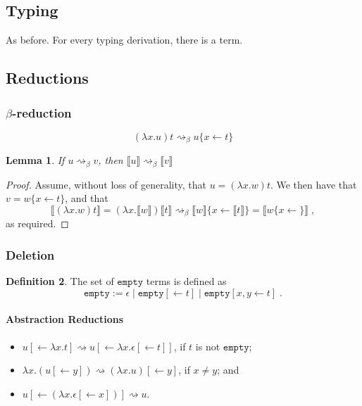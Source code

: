 \documentclass[11pt,a4paper]{article}
\theoremstyle{definition}
\newtheorem{definition}{Definition}
\theoremstyle{plain}
\newtheorem{lemma}[definition]{Lemma}
\theoremstyle{remark}
\begin{document}
\subsection{Typing}

As before. For every typing derivation, there is a term.

\subsection{Reductions}

\subsubsection{$\beta$-reduction}

\[
(\lambda x.u)t \rightsquigarrow_\beta u\{x\leftarrow t\}
\]


\begin{lemma}
	If $u\rightsquigarrow_\beta v$, then $\llbracket u\rrbracket \rightsquigarrow_\beta\llbracket v\rrbracket$
\end{lemma}

\begin{proof}
	Assume, without loss of generality, that $u=(\lambda x.w)t$. We then have that $v=w\{x\leftarrow t\}$, and that
	\[
	\llbracket(\lambda x.w)t\rrbracket = (\lambda x.\llbracket w\rrbracket)\llbracket t\rrbracket\rightsquigarrow_\beta\llbracket w\rrbracket\{x\leftarrow\llbracket t\rrbracket\} = \llbracket w\{x\leftarrow\}\rrbracket\;,
	\]
	as required.
\end{proof}

\subsubsection{Deletion}

\newcommand{\tempty}{{\mathtt{empty}}}

\begin{definition}
	The set of $\tempty$ terms is defined as
	\[\tempty:=\epsilon\;|\;\tempty[\leftarrow t]\;|\;\tempty[x,y\leftarrow t]\;.\]
\end{definition}

\paragraph{Abstraction Reductions}

\begin{itemize}
	\item $u[\leftarrow\lambda x.t]\rightsquigarrow u[\leftarrow\lambda x.\epsilon[\leftarrow t]]$, if $t$ is not $\tempty$;
	\item $\lambda x.(u[\leftarrow y])\rightsquigarrow (\lambda x.u)[\leftarrow y]$, if $x\neq y$; and
	\item $u[\leftarrow(\lambda x.\epsilon[\leftarrow x])]\rightsquigarrow u$.
\end{itemize}
\end{document}
